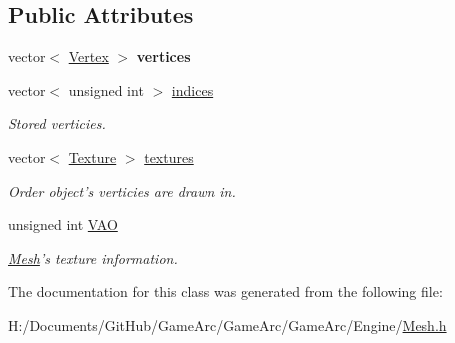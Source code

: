 \subsection*{Public Attributes}
\begin{DoxyCompactItemize}
\item 
\hypertarget{class_mesh_abe5c05c224e47ba1e8b6393759798a9b}{vector$<$ \hyperlink{struct_vertex}{Vertex} $>$ {\bfseries vertices}}\label{class_mesh_abe5c05c224e47ba1e8b6393759798a9b}

\item 
\hypertarget{class_mesh_a464d9a1d7e7a4f67321dffc1e8b44b7d}{vector$<$ unsigned int $>$ \hyperlink{class_mesh_a464d9a1d7e7a4f67321dffc1e8b44b7d}{indices}}\label{class_mesh_a464d9a1d7e7a4f67321dffc1e8b44b7d}

\begin{DoxyCompactList}\small\item\em Stored verticies. \end{DoxyCompactList}\item 
\hypertarget{class_mesh_a09bf4e8307bf7717c56501ca6293c6c0}{vector$<$ \hyperlink{struct_texture}{Texture} $>$ \hyperlink{class_mesh_a09bf4e8307bf7717c56501ca6293c6c0}{textures}}\label{class_mesh_a09bf4e8307bf7717c56501ca6293c6c0}

\begin{DoxyCompactList}\small\item\em Order object's verticies are drawn in. \end{DoxyCompactList}\item 
\hypertarget{class_mesh_a79afa055e485fb65b1a7aa5b8eda2940}{unsigned int \hyperlink{class_mesh_a79afa055e485fb65b1a7aa5b8eda2940}{V\+A\+O}}\label{class_mesh_a79afa055e485fb65b1a7aa5b8eda2940}

\begin{DoxyCompactList}\small\item\em \hyperlink{class_mesh}{Mesh}'s texture information. \end{DoxyCompactList}\end{DoxyCompactItemize}


The documentation for this class was generated from the following file\+:\begin{DoxyCompactItemize}
\item 
H\+:/\+Documents/\+Git\+Hub/\+Game\+Arc/\+Game\+Arc/\+Game\+Arc/\+Engine/\hyperlink{_mesh_8h}{Mesh.\+h}\end{DoxyCompactItemize}
